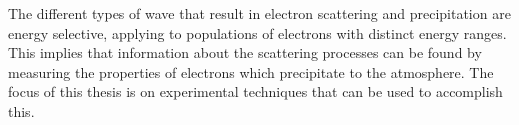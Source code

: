 The different types of wave that result in electron scattering and precipitation are energy selective, applying to populations of electrons with distinct energy ranges. This implies that information about the scattering processes can be found by measuring the properties of electrons which precipitate to the atmosphere. The focus of this thesis is on experimental techniques that can be used to accomplish this.


